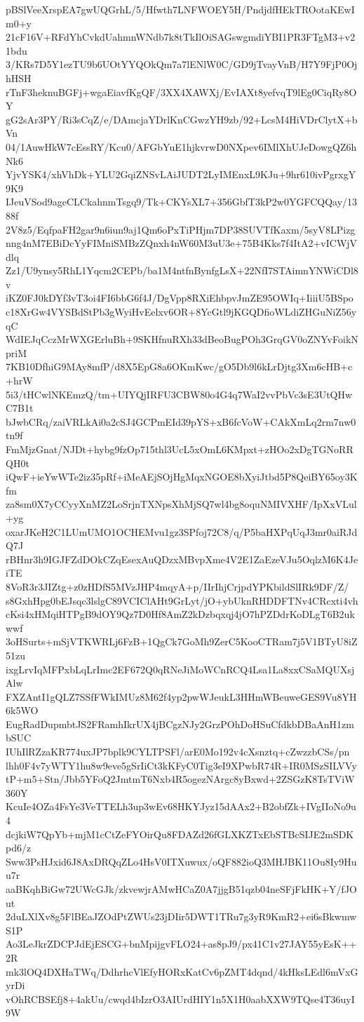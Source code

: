 pBSlVeeXrspEA7gwUQGrhL/5/Hfwth7LNFWOEY5H/PndjdfHEkTROotaKEwIm0+y
21cF16V+RFdYhCvkdUahmnWNdb7k8tTkIlOiSAGswgmdiYBI1PR3FTgM3+v21bdu
3/KRs7D5Y1ezTU9b6UOtYYQOkQm7a7lENlW0C/GD9jTvayVnB/H7Y9FjP0OjhHSH
rTnF3heknuBGFj+wgaEiavfKgQF/3XX4XAWXj/EvIAXt8yefvqT9lEg0CiqRy8OY
gG2sAr3PY/Ri3sCqZ/e/DAmcjaYDrlKnCGwzYH9zb/92+LcsM4HiVDrClytX+bVn
04/1AuwHkW7cEssRY/Kcu0/AFGbYuE1hjkvrwD0NXpev6IMlXhUJeDowgQZ6hNk6
YjvYSK4/xhVhDk+YLU2GqiZNSvLAiJUDT2LyIMEnxL9KJu+9hr610ivPgrxgY9K9
IJeuVSod9ageCLCkahnmTsgq9/Tk+CKYsXL7+356GbfT3kP2w0YGFCQQay/1388f
2V8z5/EqfpaFH2gar9n6iun9aj1Qm6oPxTiPHjm7DP38SUVTfKaxm/5syV8LPizg
nng4nM7EBiDcYyFIMniSMBzZQnxh4nW60M3uU3e+75B4Kks7f4ItA2+vICWjVdlq
Zz1/U9ynsy5RhL1Yqcm2CEPb/ba1M4ntfnBynfgLsX+22NfI7STAimnYNWiCDl8v
iKZ0FJ0kDYf3vT3oi4FI6bbG6f4J/DgVpp8RXiEhbpvJmZE95OWIq+IiiiU5BSpo
c18XrGw4VYSBdStPb3gWyiHvEelxv6OR+8YcGtl9jKGQDfioWLdiZHGuNiZ56yqC
WdIEJqCczMrWXGErluBh+9SKHfnuRXh33dBeoBugPOh3GrqGV0oZNYvFoikNpriM
7KB10DfhiG9MAy8mfP/d8X5EpG8a6OKmKwc/gO5Db9l6kLrDjtg3Xm6cHB+c+hrW
5i3/tHCwlNKEmzQ/tm+UIYQjIRFU3CBW80o4G4q7WaI2vvPbVc3sE3UtQHwC7B1t
bJwbCRq/zaiVRLkAi0a2cSJ4GCPmEId39pYS+xB6fcVoW+CAkXmLq2rm7nw0tn9f
FmMjzGnat/NJDt+hybg9fzOp715thl3UcL5xOmL6KMpxt+zHOo2xDgTGNoRRQH0t
iQwF+ieYwWTe2iz35pRf+iMeAEjSOjHgMqxNGOE8bXyiJtbd5P8QeiBY65oy3Kfm
za8sm0X7yCCyyXnMZ2LoSrjnTXNpsXhMjSQ7wl4bg8oquNMIVXHF/IpXxVLul+yg
oxarJKeH2C1LUmUMO1OCHEMvu1gz3SPfoj72C8/q/P5baHXPqUqJ3mr0aiRJdQ7J
rBHnr3h9IGJFZdDOkCZqEsexAuQDzxMBvpXme4V2E1ZaEzeVJu5OqlzM6K4JeiTE
8VoR3r3JIZtg+z0zHDfS5MVzJHP4mqyA+p/IIrIhjCrjpdYPKbildSlIRk9DF/Z/
s8GxhHpg0bEJsqc3lslgC89VCIClAHt9GrLyt/jO+ybUknRHDDFTNv4CRcxti4vh
cKsi4xHMqiHTPgB9dOY9Qz7D0Hf8AmZ2kDzbqxqj4jO7hPZDdrKoDLgT6B2ukwwf
3oHSurts+mSjVTKWRLj6FzB+1QgCk7GoMh9ZerC5KooCTRam7j5V1BTyU8iZ51zu
ixgLrvIqMFPxbLqLrImc2EF672Q0qRNeJiMoWCnRCQ4Lsa1La8xxCSaMQUXsjAlw
FXZAntI1gQLZ7SSfFWkIMUz8M62f4yp2pwWJeukL3HHmWBeuweGES9Vu8YH6k5WO
EugRadDupmbtJS2FRamhIkrUX4jBCgzNJy2GrzPOhDoHSuCfdkbDBaAnH1zmbSUC
IUhIlRZzaKR774uxJP7bplk9CYLTPSFl/arE0Mo192v4cXsnztq+cZwzzbCSs/pn
lhh0F4v7yWTY1hu8w9eve5gSrIiCt3kKFyC0Tig3eI9XPwbR74R+IR0MSzSILVVy
tP+m5+Stn/Jbb5YFoQ2JmtmT6Nxb4R5ogezNArgc8yBxwd+2ZSGzK8TsTViW360Y
KcuIe4OZa4FsYe3VeTTELh3up3wEv68HKYJyz15dAAx2+B2obfZk+IVgIIoNo9u4
dcjkiW7QpYb+mjM1cCtZeFYOirQu8FDAZd26fGLXKZTxEbSTBcSIJE2mSDKpd6/z
Sww3PsHJxid6J8AxDRQqZLo4HsV0ITXuwux/oQF882ioQ3MHJBK11Ou8Iy9Huu7r
aaBKqhBiGw72UWcGJk/zkvewjrAMwHCaZ0A7jjgB51qzb04neSFjFkHK+Y/fJOut
2duLXlXv8g5FlBEaJZOdPtZWUs23jDIir5DWT1TRu7g3yR9KmR2+ei6sBkwmwS1P
Ao3LeJkrZDCPJdEjESCG+bnMpijgvFLO24+as8pJ9/px41C1v27JAY55yEsK++2R
mk3lOQ4DXHaTWq/DdhrhcVlEfyHORxKatCv6pZMT4dqnd/4kHksLEdl6mVxGyrDi
vOhRCBSEfj8+4akUu/cwqd4bIzrO3AIUrdHIY1n5X1H0aabXXW9TQse4T36uyI9W
